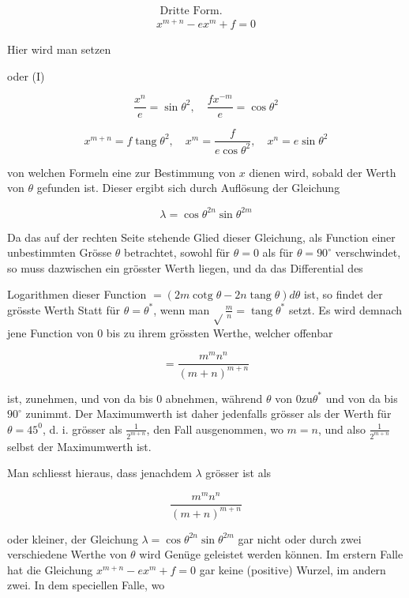 \documentclass[10pt]{article}
\begin{document}
\[
\begin{gathered}
\text { Dritte Form. } \\
x^{m+n}-e x^{m}+f=0
\end{gathered}
\]

Hier wird man setzen

oder (I)

\[
\frac{x^{n}}{e}=\sin \theta^{2}, \quad \frac{f x^{-m}}{e}=\cos \theta^{2}
\]

\[
x^{m+n}=f \operatorname{tang} \theta^{2}, \quad x^{m}=\frac{f}{e \cos \theta^{2}}, \quad x^{n}=e \sin \theta^{2}
\]

von welchen Formeln eine zur Bestimmung von \(x\) dienen wird, sobald der Werth von \(\theta\) gefunden ist. Dieser ergibt sich durch Auflösung der Gleichung

\[
\lambda=\cos \theta^{2 n} \sin \theta^{2 m}
\]

Da das auf der rechten Seite stehende Glied dieser Gleichung, als Function einer unbestimmten Grösse \(\theta\) betrachtet, sowohl für \(\theta=0\) als für \(\theta=90^{\circ}\) verschwindet, so muss dazwischen ein grösster Werth liegen, und da das Differential des

Logarithmen dieser Function \(=(2 m \operatorname{cotg} \theta-2 n \operatorname{tang} \theta) d \theta\) ist, so findet der grösste Werth Statt für \(\theta=\theta^{*}\), wenn man \(\sqrt{ } \frac{m}{n}=\operatorname{tang} \theta^{*}\) setzt. Es wird demnach jene Function von 0 bis zu ihrem grössten Werthe, welcher offenbar

\[
=\frac{m^{m} n^{n}}{(m+n)^{m+n}}
\]

ist, zunehmen, und von da bis 0 abnehmen, während \(\theta\) von \(0 \mathrm{zu} \theta^{*}\) und von da bis \(90^{\circ}\) zunimmt. Der Maximumwerth ist daher jedenfalls grösser als der Werth für \(\theta=45^{0}\), d. i. grösser als \(\frac{1}{2^{m+n}}\), den Fall ausgenommen, wo \(m=n\), und also \(\frac{1}{2^{m+n}}\) selbst der Maximumwerth ist.

Man schliesst hieraus, dass jenachdem \(\lambda\) grösser ist als

\[
\frac{m^{m} n^{n}}{(m+n)^{m+n}}
\]

oder kleiner, der Gleichung \(\lambda=\cos \theta^{2 n} \sin \theta^{2 m}\) gar nicht oder durch zwei verschiedene Werthe von \(\theta\) wird Genüge geleistet werden können. Im erstern Falle hat die Gleichung \(x^{m+n}-e x^{m}+f=0\) gar keine (positive) Wurzel, im andern zwei. In dem speciellen Falle, wo
\end{document}
